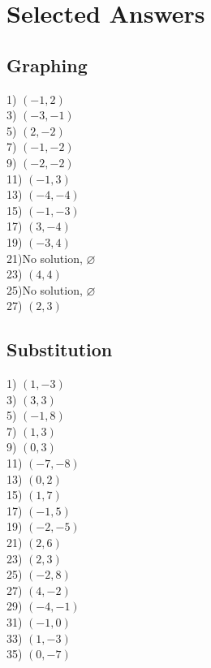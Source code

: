 \documentclass[12pt]{book}
\theoremstyle{definition}
\begin{document}
\section{Selected Answers}
\subsection*{Graphing}

\begin{multicols}{4}
1) $(-1,2)$\\
3) $(-3,-1)$\\
5) $(2,-2)$\\
7) $(-1,-2)$\\
9) $(-2,-2)$\\
11) $(-1,3)$\\
13) $(-4,-4)$\\
15) $(-1,-3)$\\
17) $(3,-4)$\\
19) $(-3,4)$\\
21)No solution, $\varnothing$\\
23) $(4,4)$\\
25)No solution, $\varnothing$\\
27) $(2,3)$\\
\end{multicols}

\subsection*{Substitution}

\begin{multicols}{4}
1) $(1,-3)$\\
3) $(3,3)$\\
5) $(-1,8)$\\
7) $(1,3)$\\
9) $(0,3)$\\
11) $(-7,-8)$\\
13) $(0,2)$\\
15) $(1,7)$\\
17) $(-1,5)$\\
19) $(-2,-5)$\\
21) $(2,6)$\\
23) $(2,3)$\\
25) $(-2,8)$\\
27) $(4,-2)$\\
29) $(-4,-1)$\\
31) $(-1,0)$\\
33) $(1,-3)$\\
35) $(0,-7)$\\
\end{multicols}
\end{document}
